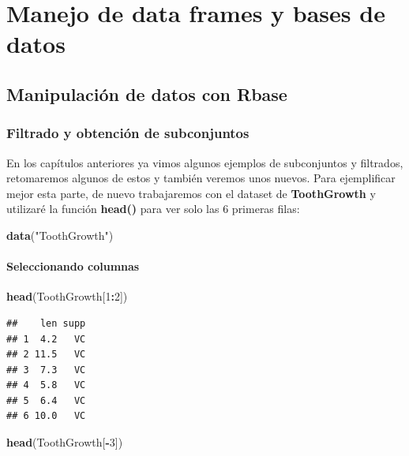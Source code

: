 \documentclass[
]{book}
\newenvironment{Shaded}{\begin{snugshade}}{\end{snugshade}}
\newcommand{\DecValTok}[1]{\textcolor[rgb]{0.00,0.00,0.81}{#1}}
\newcommand{\FunctionTok}[1]{\textcolor[rgb]{0.13,0.29,0.53}{\textbf{#1}}}
\newcommand{\NormalTok}[1]{#1}
\newcommand{\SpecialCharTok}[1]{\textcolor[rgb]{0.81,0.36,0.00}{\textbf{#1}}}
\newcommand{\StringTok}[1]{\textcolor[rgb]{0.31,0.60,0.02}{#1}}
\begin{document}
\chapter{Manejo de data frames y bases de datos}\label{manejo-de-data-frames-y-bases-de-datos}

\section{Manipulación de datos con Rbase}\label{manipulaciuxf3n-de-datos-con-rbase}

\subsection{Filtrado y obtención de subconjuntos}\label{filtrado-y-obtenciuxf3n-de-subconjuntos}

En los capítulos anteriores ya vimos algunos ejemplos de subconjuntos y filtrados, retomaremos algunos de estos y también veremos unos nuevos.
Para ejemplificar mejor esta parte, de nuevo trabajaremos con el dataset de \textbf{ToothGrowth} y utilizaré la función \textbf{head()} para ver solo las 6 primeras filas:

\begin{Shaded}
\begin{Highlighting}[]
\FunctionTok{data}\NormalTok{(}\StringTok{"ToothGrowth"}\NormalTok{)}
\end{Highlighting}
\end{Shaded}

\subsubsection{Seleccionando columnas}\label{seleccionando-columnas}

\begin{Shaded}
\begin{Highlighting}[]
\FunctionTok{head}\NormalTok{(ToothGrowth[}\DecValTok{1}\SpecialCharTok{:}\DecValTok{2}\NormalTok{])}
\end{Highlighting}
\end{Shaded}

\begin{verbatim}
##    len supp
## 1  4.2   VC
## 2 11.5   VC
## 3  7.3   VC
## 4  5.8   VC
## 5  6.4   VC
## 6 10.0   VC
\end{verbatim}

\begin{Shaded}
\begin{Highlighting}[]
\FunctionTok{head}\NormalTok{(ToothGrowth[}\SpecialCharTok{{-}}\DecValTok{3}\NormalTok{])}
\end{Highlighting}
\end{Shaded}
\end{document}
